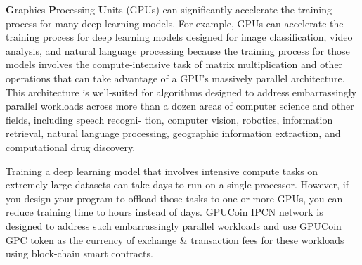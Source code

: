 \textbf{G}raphics \textbf{P}rocessing \textbf{U}nits (GPUs) can significantly accelerate the training process for many deep learning models. For example, GPUs can accelerate the training process for deep learning models designed for image classification, video analysis, and natural language processing because the training process for those models involves the compute-intensive task of matrix multiplication and other operations that can take advantage of a GPU's massively parallel architecture. This architecture is well-suited for algorithms designed to address embarrassingly parallel workloads across more than a dozen areas of computer science and other fields, including speech recogni- tion, computer vision, robotics, information retrieval, natural language processing, geographic information extraction, and computational drug discovery.

Training a deep learning model that involves intensive compute tasks on extremely large datasets can take days to run on a single processor. However, if you design your program to offload those tasks to one or more GPUs, you can reduce training time to hours instead of days. GPUCoin IPCN network is designed to address such embarrassingly parallel workloads and use GPUCoin GPC token as the currency of exchange \& transaction fees for these workloads using block-chain smart contracts.